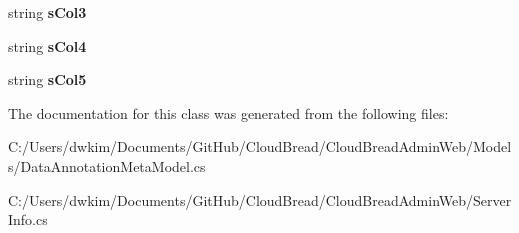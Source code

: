 \begin{DoxyCompactItemize}
\item 
string {\bfseries s\+Col3}\hypertarget{class_cloud_bread_admin_web_1_1_server_info_abe2cb17a978597dc5a648d9aa8cbeb05}{}\label{class_cloud_bread_admin_web_1_1_server_info_abe2cb17a978597dc5a648d9aa8cbeb05}

\item 
string {\bfseries s\+Col4}\hypertarget{class_cloud_bread_admin_web_1_1_server_info_a8ff00289ea099f1b498c9901e5b58da1}{}\label{class_cloud_bread_admin_web_1_1_server_info_a8ff00289ea099f1b498c9901e5b58da1}

\item 
string {\bfseries s\+Col5}\hypertarget{class_cloud_bread_admin_web_1_1_server_info_adf00eb570fe01f925d3014d1b67e7bd2}{}\label{class_cloud_bread_admin_web_1_1_server_info_adf00eb570fe01f925d3014d1b67e7bd2}

\end{DoxyCompactItemize}


The documentation for this class was generated from the following files\+:\begin{DoxyCompactItemize}
\item 
C\+:/\+Users/dwkim/\+Documents/\+Git\+Hub/\+Cloud\+Bread/\+Cloud\+Bread\+Admin\+Web/\+Models/Data\+Annotation\+Meta\+Model.\+cs\item 
C\+:/\+Users/dwkim/\+Documents/\+Git\+Hub/\+Cloud\+Bread/\+Cloud\+Bread\+Admin\+Web/Server\+Info.\+cs\end{DoxyCompactItemize}
